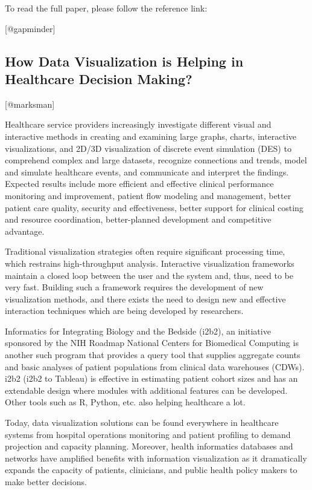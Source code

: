 \documentclass[]{book}
\theoremstyle{definition}
\theoremstyle{definition}
\theoremstyle{definition}
\theoremstyle{remark}
\begin{document}
To read the full paper, please follow the reference link:

{[}@gapminder{]}

\subsection{How Data Visualization is Helping in Healthcare Decision
Making?}\label{how-data-visualization-is-helping-in-healthcare-decision-making}

{[}@marksman{]}

Healthcare service providers increasingly investigate different visual
and interactive methods in creating and examining large graphs, charts,
interactive visualizations, and 2D/3D visualization of discrete event
simulation (DES) to comprehend complex and large datasets, recognize
connections and trends, model and simulate healthcare events, and
communicate and interpret the findings. Expected results include more
efficient and effective clinical performance monitoring and improvement,
patient flow modeling and management, better patient care quality,
security and effectiveness, better support for clinical costing and
resource coordination, better-planned development and competitive
advantage.

Traditional visualization strategies often require significant
processing time, which restrains high-throughput analysis. Interactive
visualization frameworks maintain a closed loop between the user and the
system and, thus, need to be very fast. Building such a framework
requires the development of new visualization methods, and there exists
the need to design new and effective interaction techniques which are
being developed by researchers.

Informatics for Integrating Biology and the Bedside (i2b2), an
initiative sponsored by the NIH Roadmap National Centers for Biomedical
Computing is another such program that provides a query tool that
supplies aggregate counts and basic analyses of patient populations from
clinical data warehouses (CDWs). i2b2 (i2b2 to Tableau) is effective in
estimating patient cohort sizes and has an extendable design where
modules with additional features can be developed. Other tools such as
R, Python, etc. also helping healthcare a lot.

Today, data visualization solutions can be found everywhere in
healthcare systems from hospital operations monitoring and patient
profiling to demand projection and capacity planning. Moreover, health
informatics databases and networks have amplified benefits with
information visualization as it dramatically expands the capacity of
patients, clinicians, and public health policy makers to make better
decisions.
\end{document}
